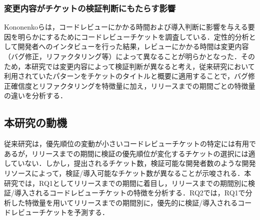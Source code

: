 \documentclass[T,J]{fose} %
\begin{document}
\subsubsection{変更内容がチケットの検証判断にもたらす影響}
Kononenko\cite{release_merge}らは，コードレビューにかかる時間および導入判断に影響を与える要因を明らかにするためにコードレビューチケットを調査している．定性的分析として開発者へのインタビューを行った結果，レビューにかかる時間は変更内容（バグ修正，リファクタリング等）によって異なることが明らかとなった．そのため，本研究では変更内容によって検証判断が異なると考え，従来研究\cite{bug}\cite{refactoring}において利用されていたパターンをチケットのタイトルと概要に適用することで，バグ修正確信度とリファクタリングを特徴量に加え，リリースまでの期間ごとの特徴量の違いを分析する．

\subsection{本研究の動機}
従来研究\cite{prioritizer}は，優先順位の変動が小さいコードレビューチケットの特定には有用であるが，リリースまでの期間に検証の優先順位が変化するチケットの選択には適していない．しかし，提出されるチケット数，検証可能な開発者数のような開発リソースによって，検証/導入可能なチケット数が異なることが示唆される．本研究では，RQ1としてリリースまでの期間に着目し，リリースまでの期間別に検証/導入されるコードレビューチケットの特徴を分析する．RQ2では，RQ1で分析した特徴量を用いてリリースまでの期間別に，優先的に検証/導入されるコードレビューチケットを予測する．




\end{document}
